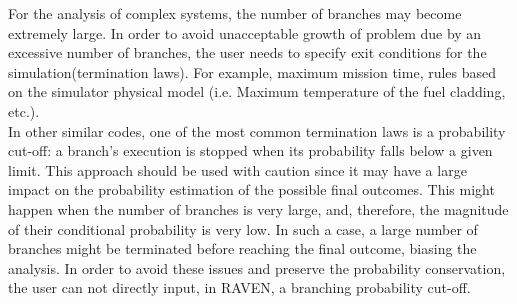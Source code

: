 For the analysis of complex systems, the number of branches may become extremely large. In order to avoid unacceptable growth of problem due by an excessive number of branches, the user needs to specify exit conditions for the simulation(termination laws). For example, maximum mission time, rules based on the simulator physical model (i.e. Maximum temperature of the fuel cladding, etc.).
\\In other similar codes, one of the most common termination laws is a probability cut-off: a branch's execution is stopped when its probability falls below a given limit.
This approach should be used with caution since it may have a large impact on the probability estimation of the possible final outcomes. This might happen when the number of branches is very large, and, therefore, the magnitude of their conditional probability is very low. In such a case, a large number of branches might be terminated before reaching the final outcome, biasing the analysis.  In order to avoid these issues and preserve the probability conservation, the user can not directly input, in RAVEN, a branching probability cut-off.
